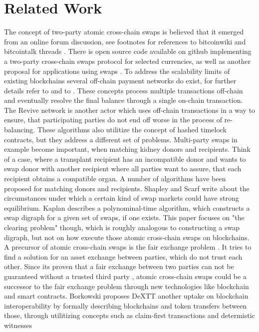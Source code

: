 \chapter{Related Work}
\label{ch:chapter03}

The concept of two-party atomic cross-chain swaps is believed that it emerged from an online forum discussion, see footnotes for references to bitcoinwiki and bitcointalk threads \cite{atomictrading} \cite{cutandchoose}. There is open source code available on github \cite{hashedtimelocked} \cite{dered} implementing a two-party cross-chain swaps protocol for selected currencies, as well as another proposal for applications using swaps \cite{zyskind2018enigma}. To address the scalability limits of existing blockchains several off-chain payment networks do exist, for further details refer to \cite{raidennetwork} and to \cite{poon2016bitcoin} \cite{decker2015fast} \cite{green2017bolt}. These concepts process multiple transactions off-chain and eventually resolve the final balance through a single on-chain transaction. The Revive network \cite{khalil2017revive} is another actor which uses off-chain transactions in a way to ensure, that participating parties do not end off worse in the process of re-balancing. These algorithms also utilitize the concept of hashed timelock contracts, but they address a different set of problems. Multi-party swaps in example become important, when matching kidney donors and recipients. Think of a case, where a transplant recipient has an incompatible donor and wants to swap donor with another recipient where all parties want to assure, that each recipient obtains a compatible organ. A number of algorithms \cite{abraham2007clearing} \cite{dickerson2016position} \cite{jia2017efficient} have been proposed for matching donors and recipients. Shapley and Scarf \cite{shapley1974cores} write about the circumstances under which a certain kind of swap markets could have strong equilibrium. Kaplan \cite{kaplan2011improved} describes a polynominal-time algorithm, which constructs a swap digraph for a given set of swaps, if one exists. This paper focuses on "the clearing problem" though, which is roughly analogous to constructing a swap digraph, but not on how execute those atomic cross-chain swaps on blockchains. A precursor of atomic cross-chain swaps is the fair exchange problem \cite{franklin1998secure} \cite{micali2003simple}. It tries to find a solution for an asset exchange between parties, which do not trust each other. Since its proven that a fair exchange between two parties can not be guaranteed without a trusted third party \cite{pagnia1999impossibility}, atomic cross-chain swaps could be a successor to the fair exchange problem through new technologies like blockchain and smart contracts. Borkowski proposes \ac{DeXTT} another uptake on blockchain interoperability by formally describing blockchains and token transfers between those, through utilitizing concepts such as claim-first transactions and determistic witnesses 